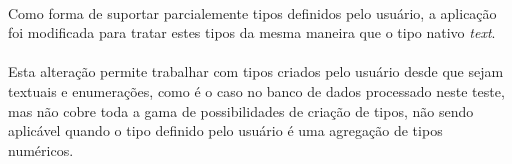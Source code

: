 \paragraph{} Como forma de suportar parcialemente tipos definidos pelo usuário, a aplicação foi modificada para tratar estes tipos da mesma maneira que o tipo nativo \textit{text}.

\paragraph{} Esta alteração permite trabalhar com tipos criados pelo usuário desde que sejam textuais e enumerações, como é o caso no banco de dados processado neste teste, mas não cobre toda a gama de possibilidades de criação de tipos, não sendo aplicável quando o tipo definido pelo usuário é uma agregação de tipos numéricos.